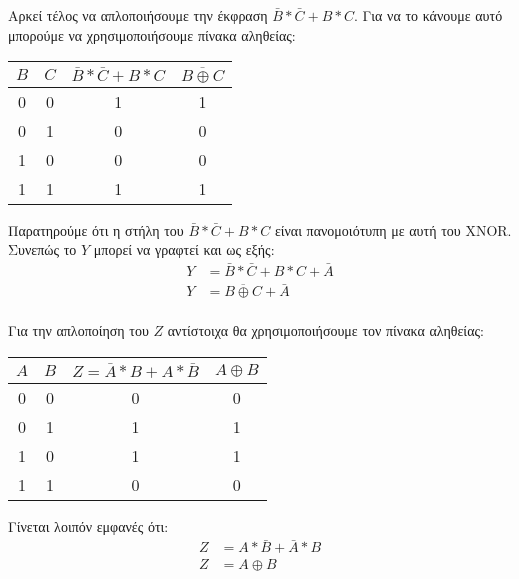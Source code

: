 \documentclass[]{article}
\begin{document}
Αρκεί τέλος να απλοποιήσουμε την έκφραση $\bar{B} * \bar{C} + B * C$. Για να το κάνουμε αυτό μπορούμε να χρησιμοποιήσουμε πίνακα αληθείας:
\begin{center}
	\begin{tabular} {|c|c|c|c|}
		\hline \rule{0pt}{11pt}$B$ & $C$ & $\bar{B} * \bar{C} + B * C$ & $\overline{B \oplus C}$ \\
		\hline 0                   & 0   & 1                           & 1                       \\
		0                          & 1   & 0                           & 0                       \\
		1                          & 0   & 0                           & 0                       \\
		1                          & 1   & 1                           & 1                       \\
		\hline
	\end{tabular}
\end{center}

Παρατηρούμε ότι η στήλη του $\bar{B} * \bar{C} + B * C$ είναι πανομοιότυπη με αυτή του XNOR. Συνεπώς το $Y$ μπορεί να γραφτεί και ως εξής:
\begin{align*}
	Y & = \bar{B} * \bar{C} + B * C + \bar{A} \\
	Y & = \overline{B \oplus C} + \bar{A}     \\
\end{align*}

Για την απλοποίηση του $Z$ αντίστοιχα θα χρησιμοποιήσουμε τον πίνακα αληθείας:
\begin{center}
	\begin{tabular} {|c|c|c|c|}
		\hline \rule{0pt}{11pt}$A$ & $B$ & $Z = \bar{A} * B + A * \bar{B}$ & $A \oplus B$ \\
		\hline 0                   & 0   & 0                               & 0            \\
		0                          & 1   & 1                               & 1            \\
		1                          & 0   & 1                               & 1            \\
		1                          & 1   & 0                               & 0            \\
		\hline
	\end{tabular}
\end{center}

Γίνεται λοιπόν εμφανές ότι:
\begin{align*}
	Z & = A * \bar{B} + \bar{A} * B \\
	Z & = A \oplus B
\end{align*}
\end{document}
